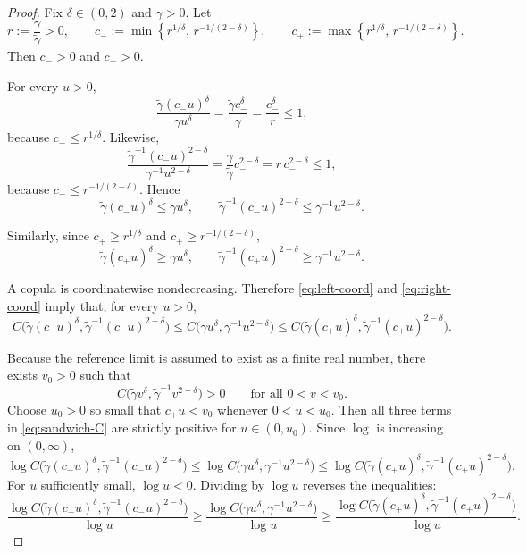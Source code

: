 \documentclass[11pt]{article}
\begin{document}
\begin{proof}
Fix $\delta\in(0,2)$ and $\gamma>0$. Let
\[
r:=\frac{\gamma}{\tilde\gamma}>0,
\qquad
c_-:=\min\!\left\{r^{1/\delta},\,r^{-1/(2-\delta)}\right\},
\qquad
c_+:=\max\!\left\{r^{1/\delta},\,r^{-1/(2-\delta)}\right\}.
\]
Then $c_->0$ and $c_+>0$.

For every $u>0$,
\[
\frac{\tilde\gamma(c_-u)^\delta}{\gamma u^\delta}
=
\frac{\tilde\gamma c_-^\delta}{\gamma}
=
\frac{c_-^\delta}{r}
\le 1,
\]
because $c_-\le r^{1/\delta}$. Likewise,
\[
\frac{\tilde\gamma^{-1}(c_-u)^{2-\delta}}{\gamma^{-1}u^{2-\delta}}
=
\frac{\gamma}{\tilde\gamma}c_-^{2-\delta}
=
r\,c_-^{2-\delta}
\le 1,
\]
because $c_-\le r^{-1/(2-\delta)}$. Hence
\begin{equation}\label{eq:left-coord}
\tilde\gamma(c_-u)^\delta \le \gamma u^\delta,
\qquad
\tilde\gamma^{-1}(c_-u)^{2-\delta}\le \gamma^{-1}u^{2-\delta}.
\end{equation}

Similarly, since $c_+\ge r^{1/\delta}$ and $c_+\ge r^{-1/(2-\delta)}$,
\begin{equation}\label{eq:right-coord}
\tilde\gamma(c_+u)^\delta \ge \gamma u^\delta,
\qquad
\tilde\gamma^{-1}(c_+u)^{2-\delta}\ge \gamma^{-1}u^{2-\delta}.
\end{equation}

A copula is coordinatewise nondecreasing. Therefore \eqref{eq:left-coord} and \eqref{eq:right-coord} imply that, for every $u>0$,
\begin{equation}\label{eq:sandwich-C}
C\!\bigl(\tilde\gamma(c_-u)^\delta,\tilde\gamma^{-1}(c_-u)^{2-\delta}\bigr)
\le
C\!\bigl(\gamma u^\delta,\gamma^{-1}u^{2-\delta}\bigr)
\le
C\!\bigl(\tilde\gamma(c_+u)^\delta,\tilde\gamma^{-1}(c_+u)^{2-\delta}\bigr).
\end{equation}

Because the reference limit is assumed to exist as a finite real number, there exists $v_0>0$ such that
\[
C\!\bigl(\tilde\gamma v^\delta,\tilde\gamma^{-1}v^{2-\delta}\bigr)>0
\qquad\text{for all }0<v<v_0.
\]
Choose $u_0>0$ so small that $c_+u<v_0$ whenever $0<u<u_0$. Then all three terms in \eqref{eq:sandwich-C} are strictly positive for $u\in(0,u_0)$. Since $\log$ is increasing on $(0,\infty)$,
\[
\log C\!\bigl(\tilde\gamma(c_-u)^\delta,\tilde\gamma^{-1}(c_-u)^{2-\delta}\bigr)
\le
\log C\!\bigl(\gamma u^\delta,\gamma^{-1}u^{2-\delta}\bigr)
\le
\log C\!\bigl(\tilde\gamma(c_+u)^\delta,\tilde\gamma^{-1}(c_+u)^{2-\delta}\bigr).
\]
For $u$ sufficiently small, $\log u<0$. Dividing by $\log u$ reverses the inequalities:
\begin{equation}\label{eq:log-sandwich}
\frac{\log C\!\bigl(\tilde\gamma(c_-u)^\delta,\tilde\gamma^{-1}(c_-u)^{2-\delta}\bigr)}{\log u}
\ge
\frac{\log C\!\bigl(\gamma u^\delta,\gamma^{-1}u^{2-\delta}\bigr)}{\log u}
\ge
\frac{\log C\!\bigl(\tilde\gamma(c_+u)^\delta,\tilde\gamma^{-1}(c_+u)^{2-\delta}\bigr)}{\log u}.
\end{equation}


\end{proof}
\end{document}
